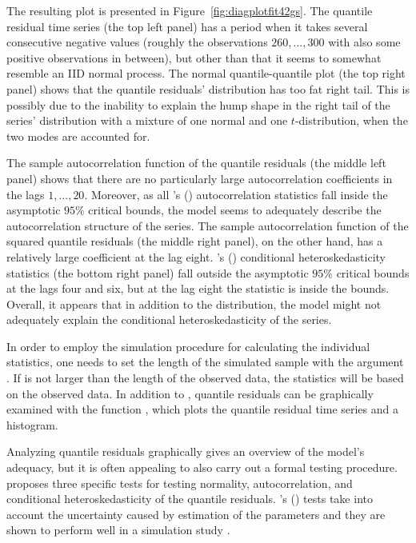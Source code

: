 \documentclass[nojss]{jss} %
\begin{document}
The resulting plot is presented in Figure~\ref{fig:diagplotfit42gs}. The quantile residual time series (the top left panel) has a period when it takes several consecutive negative values (roughly the observations $260,...,300$ with also some positive observations in between), but other than that it seems to somewhat resemble an IID normal process. The normal quantile-quantile plot (the top right panel) shows that the quantile residuals' distribution has too fat right tail. This is possibly due to the inability to explain the hump shape in the right tail of the series' distribution with a mixture of one normal and one $t$-distribution, when the two modes are accounted for.

The sample autocorrelation function of the quantile residuals (the middle left panel) shows that there are no particularly large autocorrelation coefficients in the lags $1,...,20$. Moreover, as all \citeauthor{Kalliovirta:2012}'s (\citeyear{Kalliovirta:2012}) autocorrelation statistics fall inside the asymptotic $95\%$ critical bounds, the model seems to adequately describe the autocorrelation structure of the series. The sample autocorrelation function of the squared quantile residuals (the middle right panel), on the other hand, has a relatively large coefficient at the lag eight. \citeauthor{Kalliovirta:2012}'s (\citeyear{Kalliovirta:2012}) conditional heteroskedasticity statistics (the bottom right panel) fall outside the asymptotic $95\%$ critical bounds at the lags four and six, but at the lag eight the statistic is inside the bounds. Overall, it appears that in addition to the distribution, the model might not adequately explain the conditional heteroskedasticity of the series.

In order to employ the simulation procedure for calculating the individual statistics, one needs to set the length of the simulated sample with the argument . If  is not larger than the length of the observed data, the statistics will be based on the observed data. In addition to , quantile residuals can be graphically examined with the function , which plots the quantile residual time series and a histogram.

Analyzing quantile residuals graphically gives an overview of the model's adequacy, but it is often appealing to also carry out a formal testing procedure. \cite{Kalliovirta:2012} proposes three specific tests for testing normality,  autocorrelation, and conditional heteroskedasticity of the quantile residuals. \citeauthor{Kalliovirta:2012}'s (\citeyear{Kalliovirta:2012}) tests take into account the uncertainty caused by estimation of the parameters and they are shown to perform well in a simulation study \citep[Section 4]{Kalliovirta:2012}.
\end{document}
